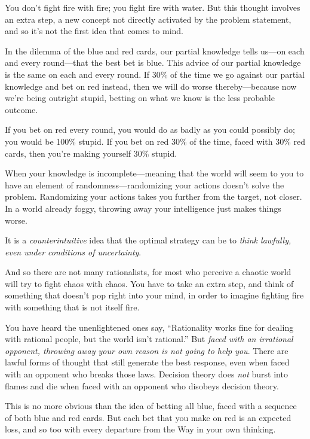 {
 You don't fight fire with fire; you fight fire
with water. But this thought involves an extra step, a new concept not
directly activated by the problem statement, and so
it's not the first idea that comes to mind.}

{
 In the dilemma of the blue and red cards, our partial knowledge
tells us---on each and every round---that the best bet is blue. This
advice of our partial knowledge is the same on each and every round. If
30\% of the time we go against our partial knowledge and bet on red
instead, then we will do worse thereby---because now
we're being outright stupid, betting on what we know is
the less probable outcome.}

{
 If you bet on red every round, you would do as badly as you could
possibly do; you would be 100\% stupid. If you bet on red 30\% of the
time, faced with 30\% red cards, then you're making
yourself 30\% stupid.}

{
 When your knowledge is incomplete---meaning that the world will
seem to you to have an element of randomness---randomizing your actions
doesn't solve the problem. Randomizing your actions
takes you further from the target, not closer. In a world already
foggy, throwing away your intelligence just makes things worse.}

{
 It is a \textit{counterintuitive} idea that the optimal strategy
can be to \textit{think lawfully, even under conditions of
uncertainty}.}

{
 And so there are not many rationalists, for most who perceive a
chaotic world will try to fight chaos with chaos. You have to take an
extra step, and think of something that doesn't pop
right into your mind, in order to imagine fighting fire with something
that is not itself fire.}

{
 You have heard the unenlightened ones say,
``Rationality works fine for dealing with rational
people, but the world isn't
rational.'' But \textit{faced with an irrational
opponent, throwing away your own reason is not going to help you}.
There are lawful forms of thought that still generate the best
response, even when faced with an opponent who breaks those laws.
Decision theory does \textit{not} burst into flames and die when faced
with an opponent who disobeys decision theory.}

{
 This is no more obvious than the idea of betting all blue, faced
with a sequence of both blue and red cards. But each bet that you make
on red is an expected loss, and so too with every departure from the
Way in your own thinking.}

